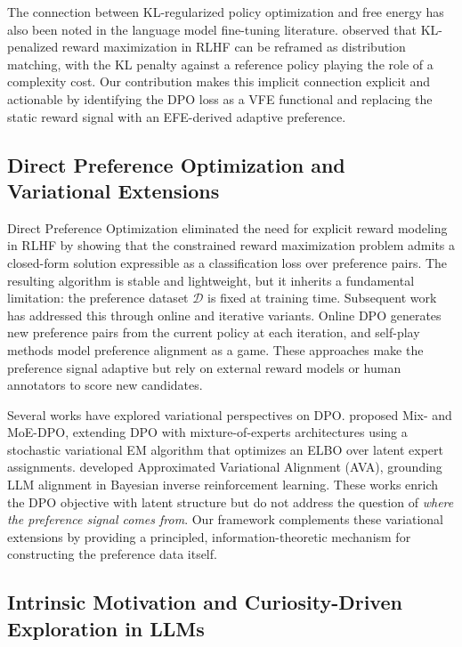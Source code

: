 \documentclass[11pt]{article}
\begin{document}
The connection between KL-regularized policy optimization and free energy has also been noted in the language model fine-tuning literature. \citet{korbak2022rl} observed that KL-penalized reward maximization in RLHF can be reframed as distribution matching, with the KL penalty against a reference policy playing the role of a complexity cost. Our contribution makes this implicit connection explicit and actionable by identifying the DPO loss as a VFE functional and replacing the static reward signal with an EFE-derived adaptive preference.

\subsection{Direct Preference Optimization and Variational Extensions}

Direct Preference Optimization \citep{rafailov2023direct} eliminated the need for explicit reward modeling in RLHF by showing that the constrained reward maximization problem admits a closed-form solution expressible as a classification loss over preference pairs. The resulting algorithm is stable and lightweight, but it inherits a fundamental limitation: the preference dataset $\mathcal{D}$ is fixed at training time. Subsequent work has addressed this through online and iterative variants. Online DPO \citep{xiong2023iterative,dong2024rlhf} generates new preference pairs from the current policy at each iteration, and self-play methods \citep{swamy2024minimax} model preference alignment as a game. These approaches make the preference signal adaptive but rely on external reward models or human annotators to score new candidates.

Several works have explored variational perspectives on DPO. \citet{bohne2025mix} proposed Mix- and MoE-DPO, extending DPO with mixture-of-experts architectures using a stochastic variational EM algorithm that optimizes an ELBO over latent expert assignments. \citet{yu2024ava} developed Approximated Variational Alignment (AVA), grounding LLM alignment in Bayesian inverse reinforcement learning. These works enrich the DPO objective with latent structure but do not address the question of \emph{where the preference signal comes from}. Our framework complements these variational extensions by providing a principled, information-theoretic mechanism for constructing the preference data itself.

\subsection{Intrinsic Motivation and Curiosity-Driven Exploration in LLMs}
\end{document}

